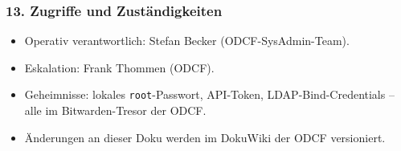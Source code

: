 \subsubsection*{13. Zugriffe und Zuständigkeiten}
\begin{itemize}\setlength{\itemsep}{1pt}
    \item Operativ verantwortlich: Stefan Becker
          (\ac{ODCF}-SysAdmin-Team).
    \item Eskalation: Frank Thommen (\ac{ODCF}).
    \item Geheimnisse: lokales \texttt{root}-Passwort, API-Token,
          LDAP-Bind-Credentials -- alle im Bitwarden-Tresor der
          \ac{ODCF}.
    \item Änderungen an dieser Doku werden im DokuWiki der
          \ac{ODCF} versioniert.
\end{itemize}
